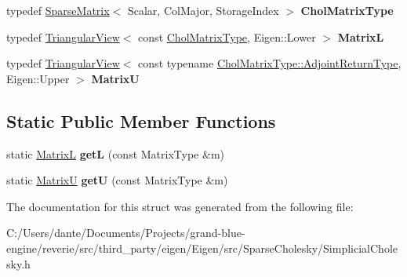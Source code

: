 \begin{DoxyCompactItemize}
typedef \mbox{\hyperlink{class_eigen_1_1_sparse_matrix}{Sparse\+Matrix}}$<$ Scalar, Col\+Major, Storage\+Index $>$ {\bfseries Chol\+Matrix\+Type}
\item 
\mbox{\label{struct_eigen_1_1internal_1_1traits_3_01_simplicial_l_l_t_3_01___matrix_type_00_01___up_lo_00_01___ordering_01_4_01_4_ad3cb1af9b45f34edb7b0c2e2280a18ff}} 
typedef \mbox{\hyperlink{class_eigen_1_1_triangular_view}{Triangular\+View}}$<$ const \mbox{\hyperlink{class_eigen_1_1_sparse_matrix}{Chol\+Matrix\+Type}}, Eigen\+::\+Lower $>$ {\bfseries MatrixL}
\item 
\mbox{\label{struct_eigen_1_1internal_1_1traits_3_01_simplicial_l_l_t_3_01___matrix_type_00_01___up_lo_00_01___ordering_01_4_01_4_a016df454cac8fb666c5db0b0558c664c}} 
typedef \mbox{\hyperlink{class_eigen_1_1_triangular_view}{Triangular\+View}}$<$ const typename \mbox{\hyperlink{struct_eigen_1_1internal_1_1true__type}{Chol\+Matrix\+Type\+::\+Adjoint\+Return\+Type}}, Eigen\+::\+Upper $>$ {\bfseries MatrixU}
\end{DoxyCompactItemize}
\subsection*{Static Public Member Functions}
\begin{DoxyCompactItemize}
\item 
\mbox{\label{struct_eigen_1_1internal_1_1traits_3_01_simplicial_l_l_t_3_01___matrix_type_00_01___up_lo_00_01___ordering_01_4_01_4_a033298b6c58837a99b2ad57713254826}} 
static \mbox{\hyperlink{class_eigen_1_1_triangular_view}{MatrixL}} {\bfseries getL} (const Matrix\+Type \&m)
\item 
\mbox{\label{struct_eigen_1_1internal_1_1traits_3_01_simplicial_l_l_t_3_01___matrix_type_00_01___up_lo_00_01___ordering_01_4_01_4_a2df55ac6690830d6f90a080379c61f3c}} 
static \mbox{\hyperlink{class_eigen_1_1_triangular_view}{MatrixU}} {\bfseries getU} (const Matrix\+Type \&m)
\end{DoxyCompactItemize}


The documentation for this struct was generated from the following file\+:\begin{DoxyCompactItemize}
\item 
C\+:/\+Users/dante/\+Documents/\+Projects/grand-\/blue-\/engine/reverie/src/third\+\_\+party/eigen/\+Eigen/src/\+Sparse\+Cholesky/Simplicial\+Cholesky.\+h\end{DoxyCompactItemize}
